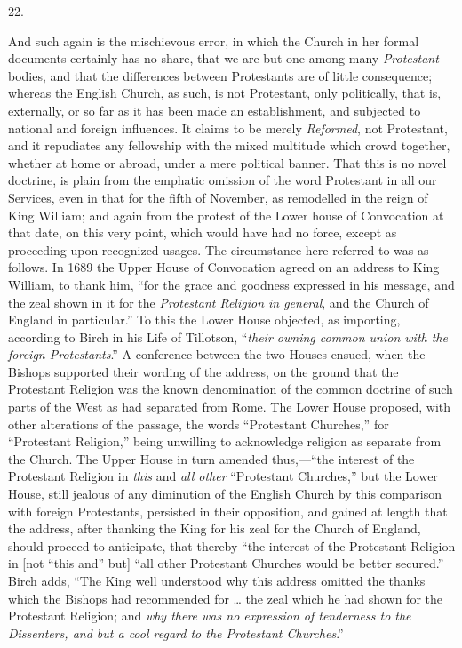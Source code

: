 22.

And such again is the mischievous error, in which
the Church in her formal documents certainly has no share, that we are
but one among many \emph{Protestant} bodies, and that the differences
between Protestants are of little consequence; whereas the English
Church, as such, is not Protestant, only politically, that is,
externally, or so far as it has been made an establishment, and
subjected to national and foreign influences. It claims to be
merely \emph{Reformed}, not Protestant, and it repudiates any
fellowship with the mixed multitude which crowd together, whether at
home or abroad, under a mere political banner. That this is no novel
doctrine, is plain from the emphatic omission of the word Protestant
in all our Services, even in that for the fifth of November, as
remodelled in the reign of King William; and again from the protest of
the Lower house of Convocation at that date, on this very point, which
would have had no force, except as proceeding upon recognized usages.
The circumstance here referred to was as follows. In 1689 the Upper
House of Convocation agreed on an address to King William, to thank
him, ``for the grace and goodness expressed in his message, and the
zeal shown in it for the \emph{Protestant Religion in general}, and
the Church of England in particular.'' To this the Lower House
objected, as importing, according to Birch in his Life of Tillotson, ``\emph{their
owning common union with the foreign Protestants}.'' A conference
between the two Houses ensued, when the Bishops supported their
wording of the address, on the ground that the Protestant Religion was
the known denomination of the common doctrine of such parts of the
West as had separated from Rome. The Lower House proposed, with other
alterations of the passage, the words ``Protestant Churches,'' for ``Protestant
Religion,'' being unwilling to acknowledge religion as separate from
the Church. The Upper House in turn amended thus,—``the interest of
the Protestant Religion in \emph{this} and \emph{all other} ``Protestant
Churches,'' but the Lower House, still jealous of any diminution of the
English Church by this comparison with foreign Protestants, persisted
in their opposition, and gained at length that the address, after
thanking the King for his zeal for the Church of England, should
proceed to anticipate, that thereby ``the interest of the Protestant
Religion in [not ``this and'' but] ``all other Protestant Churches
would be better secured.'' Birch adds, ``The King well understood why
this address omitted the thanks which the Bishops had recommended for
… the zeal which he had shown for the Protestant Religion; and \emph{why
there was no expression of tenderness to the Dissenters, and but a
cool regard to the Protestant Churches}.''

